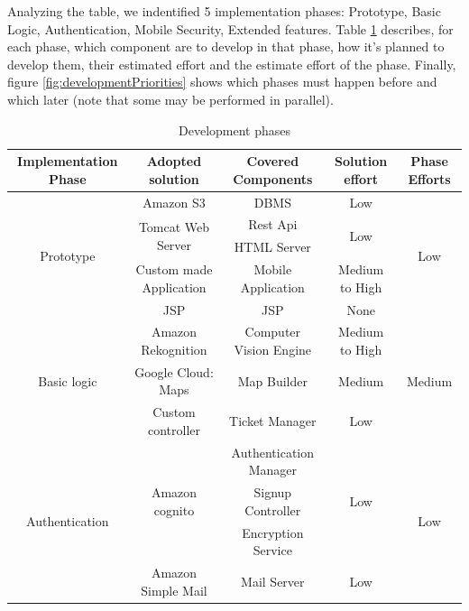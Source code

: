 \documentclass{article}
\begin{document}
Analyzing the table, we indentified 5 implementation phases: Prototype, Basic Logic, Authentication, Mobile Security, Extended features. Table \ref{tab:developPhases} describes, for each phase, which component are to develop in that phase, how it's planned to develop them, their estimated effort and the estimate effort of the phase. Finally, figure \ref{fig:developmentPriorities} shows which phases must happen before and which later (note that some may be performed in parallel).
\begin{table}[h]
\begin{center}
\caption{Development phases}
\label{tab:developPhases}
\small
\centering
\begin{tabular}{|c|c|c|c|c|}
		\hline
		\textbf{Implementation Phase}		&\textbf{Adopted solution}					&\textbf{Covered Components}		&\textbf{Solution effort}	&\textbf{Phase Efforts}\\
		\hline
		\multirow{5}{*}{Prototype}			&Amazon S3									&DBMS							&Low				&\multirow{5}{*}{Low}			\\
											\cline{2-4}
											&\multirow{2}{*}{Tomcat Web Server}			&Rest Api						&\multirow{2}{*}{Low}&							\\
											&											&HTML Server						&				&								\\
											\cline{2-4}
											&Custom made Application						&Mobile Application				&Medium to High	&								\\
											\cline{2-4}
											&JSP											&JSP								&None			&								\\
		\hline
		\multirow{3}{*}{Basic logic}			&Amazon Rekognition							&Computer Vision Engine			&Medium to High	&\multirow{3}{*}{Medium}			\\
											\cline{2-4}
											&Google Cloud: Maps							&Map Builder						&Medium			&								\\
											\cline{2-4}
											&Custom controller							&Ticket Manager					&Low				&								\\
		\hline		
		\multirow{4}{*}{Authentication}		&\multirow{3}{*}{Amazon cognito}				&Authentication Manager			&\multirow{3}{*}{Low}&\multirow{4}{*}{Low}		\\
											&											&Signup Controller				&				&								\\
											&											&Encryption Service				&				&								\\
											\cline{2-4}
											&Amazon Simple Mail							&Mail Server						&Low				&								\\

\end{tabular}
\end{center}
\end{table}
\end{document}
